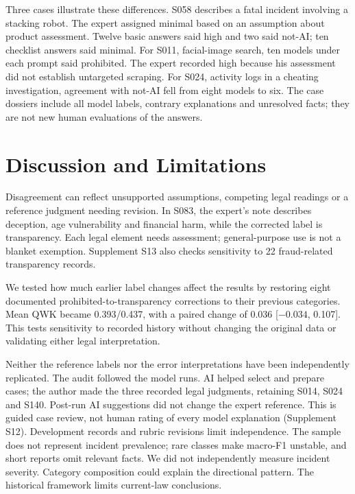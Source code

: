 \documentclass[sigconf,natbib=false,language=english]{acmart}
\begin{document}
Three cases illustrate these differences. S058 describes a fatal incident involving a stacking robot. The expert assigned minimal based on an assumption about product assessment. Twelve basic answers said high and two said not-AI; ten checklist answers said minimal. For S011, facial-image search, ten models under each prompt said prohibited. The expert recorded high because his assessment did not establish untargeted scraping. For S024, activity logs in a cheating investigation, agreement with not-AI fell from eight models to six. The case dossiers include all model labels, contrary explanations and unresolved facts; they are not new human evaluations of the answers.

\section{Discussion and Limitations}
Disagreement can reflect unsupported assumptions, competing legal readings or a reference judgment needing revision. In S083, the expert's note describes deception, age vulnerability and financial harm, while the corrected label is transparency. Each legal element needs assessment; general-purpose use is not a blanket exemption. Supplement S13 also checks sensitivity to 22 fraud-related transparency records.

We tested how much earlier label changes affect the results by restoring eight documented prohibited-to-transparency corrections to their previous categories. Mean QWK became 0.393/0.437, with a paired change of 0.036 [$-0.034$, 0.107]. This tests sensitivity to recorded history without changing the original data or validating either legal interpretation.

Neither the reference labels nor the error interpretations have been independently replicated. The audit followed the model runs. AI helped select and prepare cases; the author made the three recorded legal judgments, retaining S014, S024 and S140. Post-run AI suggestions did not change the expert reference. This is guided case review, not human rating of every model explanation (Supplement S12). Development records and rubric revisions limit independence. The sample does not represent incident prevalence; rare classes make macro-F1 unstable, and short reports omit relevant facts. We did not independently measure incident severity. Category composition could explain the directional pattern. The historical framework limits current-law conclusions.

\newpage
\balance
\end{document}
